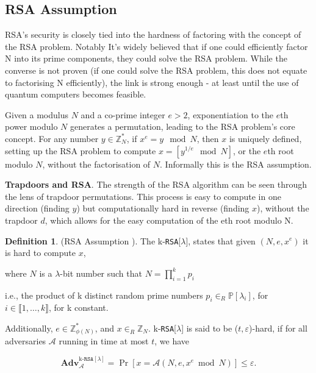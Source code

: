 \documentclass[]{final_report}
\theoremstyle{definition}
\newtheorem{definition}{Definition}[chapter]
\begin{document}
\subsection{RSA Assumption}
\label{subSec:RSA-ASS}
RSA's security is closely tied into the hardness of factoring with the concept of the RSA problem. Notably It's widely believed that if one could efficiently factor N into its prime components, they could solve the RSA problem. While the converse is not proven (if one could solve the RSA problem, this does not equate to factorising N efficiently), the link is strong enough - at least until the use of quantum computers becomes feasible.

Given a modulus \(N\) and a co-prime integer \(e > 2\), exponentiation to the \(e\)th power modulo \(N\) generates a permutation, leading to the RSA problem's core concept. For any number \(y \in \mathbb{Z}^*_{N}\), if \(x^e = y \mod N\), then \(x\) is uniquely defined, setting up the RSA problem to compute \(x = [y^{1/e} \mod N]\), or the \(e\)th root modulo \(N\), without the factorisation of \(N\). Informally this is the RSA assumption.

\textbf{Trapdoors and RSA}. The strength of the RSA algorithm can be seen through the lens of trapdoor permutations. This process is easy to compute in one direction (finding \(y\)) but computationally hard in reverse (finding \(x\)), without the trapdoor \(d\), which allows for the easy computation of the eth root modulo N.

\begin{definition}
\label{def:RSA-ASS}
(RSA Assumption \cite{10.1145/359340.359342}). The k-\texttt{RSA}[$\lambda$], states that given $(N, e, x^e)$ it is hard to compute $x$, 

where $N$ is a $\lambda$-bit number such that $N = \displaystyle\prod_{i=1}^{k} p_i$ 

i.e., the product of k distinct random prime numbers $p_i \in_{R} \mathbb{P}[\lambda_i]$, for $i \in \llbracket1, \ldots, k \rrbracket$, for k constant. 

Additionally, $e \in \mathbb{Z}_{\phi(N)}^{*}$, and $x \in_R \mathbb{Z}_N$. k-\texttt{RSA}[$\lambda$] is said to be ($t, \varepsilon$)-hard, if for all adversaries $ \mathcal{A}$ running in time at most $t$, we have

\[ \textbf{Adv}_ \mathcal{A}^{\text{k-}\texttt{RSA}[\lambda]} = \Pr [x =  \mathcal{A}(N, e, x^e \bmod N) ] \leq \varepsilon. \]
\end{definition}
\end{document}
